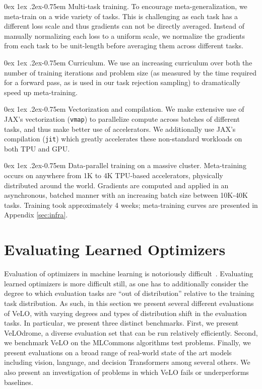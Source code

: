 \documentclass[11pt]{article}
\makeatletter
\renewcommand{\paragraph}{%
  \@startsection{paragraph}{4}%
  {\z@}{0ex \@plus 1ex \@minus .2ex}{-0.75em}%
  {\normalfont\normalsize\bfseries}%
}
\makeatother
\begin{document}
\paragraph{Multi-task training.}
To encourage meta-generalization, we meta-train on a wide variety of tasks.
This is challenging as each task has a different loss scale and thus gradients can not be directly averaged.
Instead of manually normalizing each loss to a uniform scale, we normalize the gradients from each task to be unit-length before averaging them across different tasks.

\paragraph{Curriculum.}
We use an increasing curriculum over both the number of training iterations and problem size (as measured by the time required for a forward pass, as is used in our task rejection sampling) to dramatically speed up meta-training. 

\paragraph{Vectorization and compilation.}
We make extensive use of JAX's vectorization (\texttt{vmap}) to parallelize compute across 
batches of different tasks, and thus make better use of accelerators.
We additionally use JAX's compilation (\texttt{jit}) which greatly accelerates these non-standard workloads on both TPU and GPU.

\paragraph{Data-parallel training on a massive cluster.}
Meta-training occurs on anywhere from 1K to 4K TPU-based accelerators, physically distributed around the world.
Gradients are computed and applied in an asynchronous, batched manner with an increasing batch size between 10K-40K tasks.
Training took approximately 4 weeks; meta-training curves are presented in Appendix \ref{sec:infra}.

\section{Evaluating Learned Optimizers}
Evaluation of optimizers in machine learning is notoriously difficult~\citep{choi2019empirical, schmidt2020descending}.
Evaluating learned optimizers is more difficult still, as one has to additionally consider the degree to which evaluation tasks are ``out of distribution'' relative to the training task distribution. 
As such, in this section we present several different evaluations of VeLO, with varying degrees and types of distribution shift in the evaluation tasks. 
In particular, we present three distinct benchmarks. First, we present VeLOdrome, a diverse evaluation set that can be run relatively efficiently. Second, we benchmark VeLO on the MLCommons algorithms test problems. Finally, we present evaluations on a broad range of real-world state of the art models including vision, language, and decision Transformers among several others. We also present an investigation of problems in which VeLO fails or underperforms baselines. 
\end{document}
